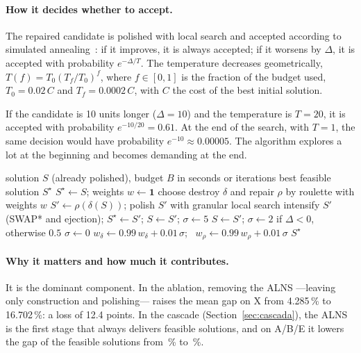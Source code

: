 \documentclass[11pt,a4paper]{article}
\newcommand{\senda}{SENDA}
\begin{document}
\paragraph{How it decides whether to accept.} The repaired candidate is polished with local search
and accepted according to simulated annealing~\cite{kirkpatrick1983}: if it improves, it is always
accepted; if it worsens by $\Delta$, it is accepted with probability $e^{-\Delta/T}$. The temperature
decreases geometrically, $T(f)=T_0(T_f/T_0)^f$, where $f\in[0,1]$ is the fraction of the budget
used, $T_0=0.02\,C$ and $T_f=0.0002\,C$, with $C$ the cost of the best initial solution.

\begin{ejemplo}
If the candidate is 10 units longer ($\Delta=10$) and the temperature is $T=20$, it is accepted with
probability $e^{-10/20}=0.61$. At the end of the search, with $T=1$, the same decision would have
probability $e^{-10}\approx0.00005$. The algorithm explores a lot at the beginning and becomes
demanding at the end.
\end{ejemplo}

\begin{algorithm}[H]
\caption{ALNS core of one \senda{} arm}
\label{alg:alns}
\begin{algorithmic}[1]
\Require solution $S$ (already polished), budget $B$ in seconds or iterations
\Ensure best feasible solution $S^\star$
\State $S^\star\gets S$; weights $w\gets\mathbf{1}$
  \State choose destroy $\delta$ and repair $\rho$ by roulette with weights $w$
  \State $S'\gets\rho(\delta(S))$; polish $S'$ with granular local search
     \State intensify $S'$ (SWAP* and ejection); $S^\star\gets S'$; $S\gets S'$; $\sigma\gets5$
     \State $S\gets S'$; $\sigma\gets 2$ if $\Delta<0$, otherwise $0.5$
  \Else
     \State $\sigma\gets0$
  \EndIf
  \State $w_\delta\gets0.99\,w_\delta+0.01\,\sigma$; \ $w_\rho\gets0.99\,w_\rho+0.01\,\sigma$
\EndWhile
\State \Return $S^\star$
\end{algorithmic}
\end{algorithm}

\paragraph{Why it matters and how much it contributes.} It is the dominant component. In the ablation,
removing the ALNS ---leaving only construction and polishing--- raises the mean gap on X from
4.285\,\% to 16.702\,\%: a loss of 12.4 points. In the cascade (Section~\ref{sec:cascada}), the ALNS
is the first stage that always delivers feasible solutions, and on A/B/E it lowers the gap of the
feasible solutions from \cgfABEc\,\% to \cgfABEd\,\%.
\end{document}
